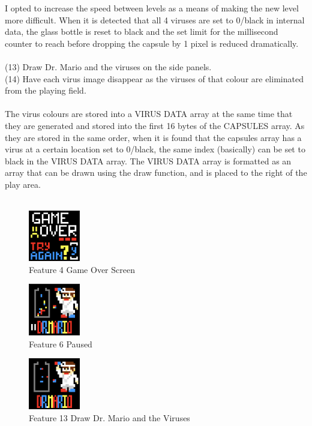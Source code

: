 \documentclass{article}
\begin{document}
I opted to increase the speed between levels as a means of making the new level more difficult. When it is detected that all 4 viruses are set to 0/black in internal data, the glass bottle is reset to black and the set limit for the millisecond counter to reach before dropping the capsule by 1 pixel is reduced dramatically.\\\\
(13) Draw Dr. Mario and the viruses on the side panels.\\
(14) Have each virus image disappear as the viruses of that colour are eliminated from the playing field.\\\\
The virus colours are stored into a VIRUS DATA array at the same time that they are generated and stored into the first 16 bytes of the CAPSULES array. As they are stored in the same order, when it is found that the capsules array has a virus at a certain location set to 0/black, the same index (basically) can be set to black in the VIRUS DATA array. The VIRUS DATA array is formatted as an array that can be drawn using the draw function, and is placed to the right of the play area.\\\\
\begin{figure}[ht!]
    \centering
    \includegraphics[width=0.2\textwidth]{game_over_screen.png}
    \caption{Feature 4 Game Over Screen}
    \label{Instructions}
\end{figure}
\begin{figure}[ht!]
    \centering
    \includegraphics[width=0.2\textwidth]{pause.png}
    \caption{Feature 6 Paused}
    \label{Instructions}
\end{figure}
\begin{figure}[ht!]
    \centering
    \includegraphics[width=0.2\textwidth]{drmario_and_viruses.png}
    \caption{Feature 13 Draw Dr. Mario and the Viruses}
    \label{Instructions}
\end{figure}
\end{document}
